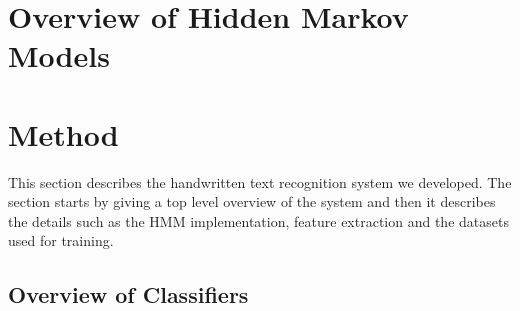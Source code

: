 \documentclass[10pt, titlepage, oneside, a4paper]{article}
\begin{document}
	\tableofcontents
	
	\newpage


	\setlength{\parindent}{0pt}
	\setlength{\parskip}{10pt}















\section{Overview of Hidden Markov Models}



\section{Method}\label{sec:method}

This section describes the handwritten text recognition system we developed. 
The section starts by giving a top level overview of the system and then it describes the details such as the HMM implementation, feature extraction and the datasets used for training. 


\subsection{Overview of Classifiers}\label{sec:overview-of-classifiers}



\end{document}
